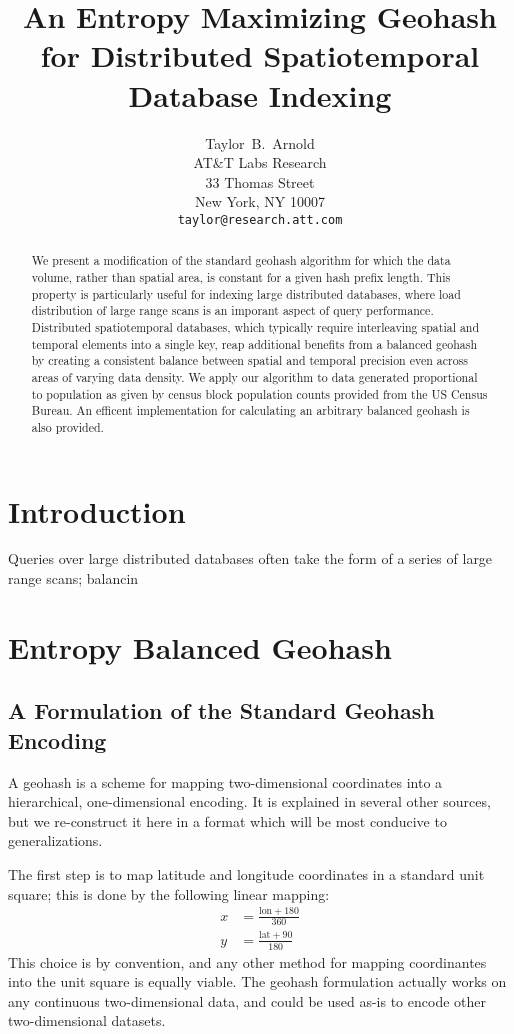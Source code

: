 \documentclass{article} %
\title{An Entropy Maximizing Geohash for Distributed Spatiotemporal Database Indexing}
\author{
Taylor~B.~Arnold \\
AT\&T Labs Research\\
33 Thomas Street\\
New York, NY 10007 \\
\texttt{taylor@research.att.com}
}
\begin{document}
\maketitle

\begin{abstract}
We present a modification of the standard geohash algorithm
for which the data volume, rather than spatial area, is constant
for a given hash prefix length. This property is particularly
useful for indexing large distributed databases, where load
distribution of large range scans is an imporant aspect of
query performance. Distributed spatiotemporal databases, which
typically require interleaving spatial and temporal elements
into a single key, reap additional benefits from a balanced
geohash by creating a consistent balance between spatial and
temporal precision even across areas of varying data density.
We apply our algorithm to data generated proportional to population
as given by census block population counts provided from the
US Census Bureau. An efficent implementation for calculating an
arbitrary balanced geohash is also provided.
\end{abstract}

\section{Introduction}

Queries over large distributed
databases often take the form of a series of large range scans;
balancin

\section{Entropy Balanced Geohash}

\subsection{A Formulation of the Standard Geohash Encoding}

A geohash is a scheme for mapping two-dimensional coordinates into a
hierarchical, one-dimensional encoding. It is explained in several
other sources, but we re-construct it here in a format which will be
most conducive to generalizations.

The first step is to map latitude and longitude coordinates in a
standard unit square; this is done by the following linear mapping:
\begin{align}
x &= \frac{\text{lon} + 180}{360} \\
y &= \frac{\text{lat} + 90}{180}
\end{align}
This choice is by convention, and any other method for mapping coordinantes
into the unit square is equally viable. The geohash formulation actually works
on any continuous two-dimensional data, and could be used  as-is to encode other
two-dimensional datasets.
\end{document}

